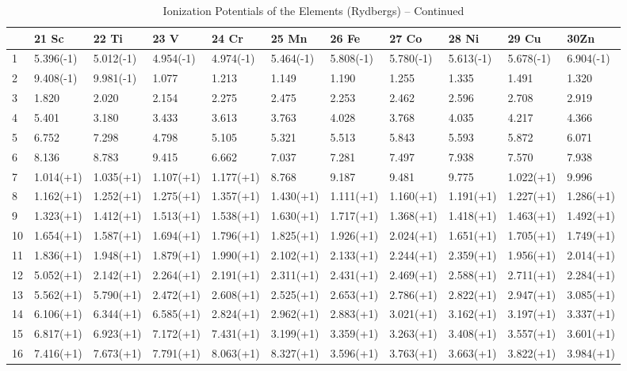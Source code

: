 \begin{table}
\begin{center}
\addtocounter{table}{-1}
\scriptsize
\caption{Ionization Potentials of the Elements (Rydbergs) -- Continued}
\begin{tabular}{lllllllllll}
\hline
& 21 Sc& 22 Ti& 23 V& 24 Cr& 25 Mn& 26 Fe& 27 Co& 28 Ni& 29 Cu& 30Zn\\
\hline
1& 5.396(-1)& 5.012(-1)& 4.954(-1)& 4.974(-1)& 5.464(-1)& 5.808(-1)&
5.780(-1)& 5.613(-1)& 5.678(-1)& 6.904(-1)\\
2& 9.408(-1)& 9.981(-1)& 1.077& 1.213& 1.149& 1.190& 1.255& 1.335& 1.491&
1.320\\
3& 1.820& 2.020& 2.154& 2.275& 2.475& 2.253& 2.462& 2.596& 2.708& 2.919\\
4& 5.401& 3.180& 3.433& 3.613& 3.763& 4.028& 3.768& 4.035& 4.217& 4.366\\
5& 6.752& 7.298& 4.798& 5.105& 5.321& 5.513& 5.843& 5.593& 5.872& 6.071\\
6& 8.136& 8.783& 9.415& 6.662& 7.037& 7.281& 7.497& 7.938& 7.570& 7.938\\
7& 1.014(+1)& 1.035(+1)& 1.107(+1)& 1.177(+1)& 8.768& 9.187& 9.481& 9.775&
1.022(+1)& 9.996\\
8& 1.162(+1)& 1.252(+1)& 1.275(+1)& 1.357(+1)& 1.430(+1)& 1.111(+1)&
1.160(+1)& 1.191(+1)& 1.227(+1)& 1.286(+1)\\
9& 1.323(+1)& 1.412(+1)& 1.513(+1)& 1.538(+1)& 1.630(+1)& 1.717(+1)&
1.368(+1)& 1.418(+1)& 1.463(+1)& 1.492(+1)\\
10& 1.654(+1)& 1.587(+1)& 1.694(+1)& 1.796(+1)& 1.825(+1)& 1.926(+1)&
2.024(+1)& 1.651(+1)& 1.705(+1)& 1.749(+1)\\
11& 1.836(+1)& 1.948(+1)& 1.879(+1)& 1.990(+1)& 2.102(+1)& 2.133(+1)&
2.244(+1)& 2.359(+1)& 1.956(+1)& 2.014(+1)\\
 12&5.052(+1)& 2.142(+1)&
2.264(+1)& 2.191(+1)& 2.311(+1)& 2.431(+1)& 2.469(+1)& 2.588(+1)& 2.711(+1)&
2.284(+1)\\
13& 5.562(+1)& 5.790(+1)& 2.472(+1)& 2.608(+1)& 2.525(+1)& 2.653(+1)&
2.786(+1)& 2.822(+1)& 2.947(+1)& 3.085(+1)\\
14& 6.106(+1)& 6.344(+1)&
6.585(+1)& 2.824(+1)& 2.962(+1)& 2.883(+1)& 3.021(+1)& 3.162(+1)& 3.197(+1)&
3.337(+1)\\
15& 6.817(+1)& 6.923(+1)& 7.172(+1)& 7.431(+1)& 3.199(+1)& 3.359(+1)&
3.263(+1)& 3.408(+1)& 3.557(+1)& 3.601(+1)\\
16& 7.416(+1)& 7.673(+1)& 7.791(+1)& 8.063(+1)& 8.327(+1)& 3.596(+1)&
3.763(+1)& 3.663(+1)& 3.822(+1)& 3.984(+1)\\

\end{tabular}
\end{center}
\end{table}
